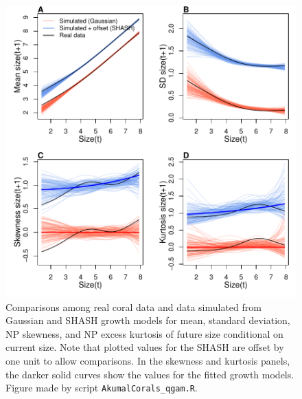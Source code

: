\documentclass[12pt]{article}
\begin{document}
\begin{spacing}{1.35}
	\begin{figure}[tbp]
		\centering
		\includegraphics[width=1.0\textwidth]{figures/coral_SHASH_fit.pdf}
		\caption{Comparisons among real coral data and data simulated from Gaussian and SHASH growth models for mean, 
			standard deviation, NP skewness, and NP excess kurtosis of future size conditional on current size. Note that plotted values for the SHASH are offset by one unit to allow comparisons. 
			In the skewness and kurtosis panels, the darker solid curves show the values for the fitted growth models. 
			Figure made by script \texttt{AkumalCorals\_qgam.R}.}
		\label{fig:coral_fit}
	\end{figure} 
	

\end{spacing}
\end{document}
